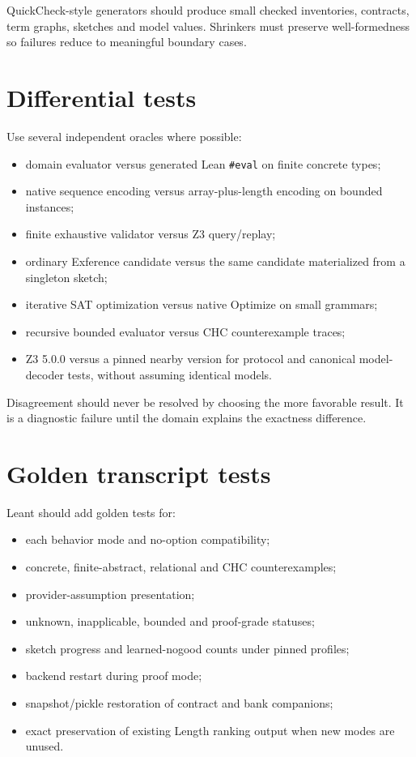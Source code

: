 \documentclass[11pt,oneside]{report}
\newcommand{\code}[1]{\texttt{#1}}
\begin{document}
QuickCheck-style generators should produce small checked inventories, contracts, term graphs, sketches and model values. Shrinkers must preserve well-formedness so failures reduce to meaningful boundary cases.

\section{Differential tests}

Use several independent oracles where possible:

\begin{itemize}[leftmargin=2em]
\item domain evaluator versus generated Lean \code{\#eval} on finite concrete types;
\item native sequence encoding versus array-plus-length encoding on bounded instances;
\item finite exhaustive validator versus Z3 query/replay;
\item ordinary Exference candidate versus the same candidate materialized from a singleton sketch;
\item iterative SAT optimization versus native Optimize on small grammars;
\item recursive bounded evaluator versus CHC counterexample traces;
\item Z3 5.0.0 versus a pinned nearby version for protocol and canonical model-decoder tests, without assuming identical models.
\end{itemize}

Disagreement should never be resolved by choosing the more favorable result. It is a diagnostic failure until the domain explains the exactness difference.

\section{Golden transcript tests}

Leant should add golden tests for:

\begin{itemize}[leftmargin=2em]
\item each behavior mode and no-option compatibility;
\item concrete, finite-abstract, relational and CHC counterexamples;
\item provider-assumption presentation;
\item unknown, inapplicable, bounded and proof-grade statuses;
\item sketch progress and learned-nogood counts under pinned profiles;
\item backend restart during proof mode;
\item snapshot/pickle restoration of contract and bank companions;
\item exact preservation of existing Length ranking output when new modes are unused.
\end{itemize}
\end{document}
